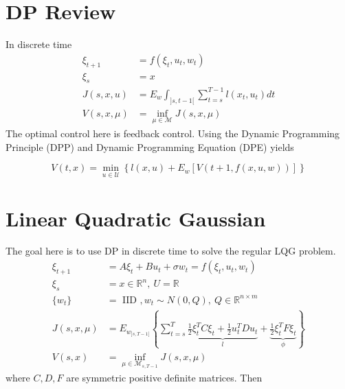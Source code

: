 \mainmatter%
\setcounter{page}{1}

\lectureseries[\course]{\course}

\date{October 13, 2009}

\setaddress%

\setcounter{lecture}{4}
\setcounter{chapter}{4}


\section{DP Review}
In discrete time
\begin{align*}
\xi_{t+1} &= f(\xi_t,u_t,w_t) \\
\xi_s &= x \\
J(s,x,u) &= E_w\int_{]s,t-1[}\sum_{t=s}^{T-1}l(x_t,u_t)dt \\%
V(s,x,\mu) &= \inf_{\mu\in\mathcal{M}}J(s,x,\mu)
\end{align*}
The optimal control here is feedback control.
Using the Dynamic Programming Principle (DPP) and Dynamic Programming Equation (DPE) yields

\begin{equation*}
V(t,x) = \min_{u\in\mathcal{U}}\left\lbrace l(x,u) + E_w[V(t+1,f(x,u,w))]\right\rbrace
\end{equation*}


\section{Linear Quadratic Gaussian}
The goal here is to use DP in discrete time to solve the regular LQG problem.
\begin{align*}
\xi_{t+1} &= A\xi_t + Bu_t + \sigma w_t = f(\xi_t,u_t,w_t) \\
\xi_s &= x \in \mathbb{R}^n,~U=\mathbb{R} \\
\{w_t\} &= \text{~IID~}, w_t\sim N(0,Q),~Q\in\mathbb{R}^{n\times m} \\
J(s,x,\mu) &= E_{w_{]s,T-1[}} \left\lbrace \sum_{t=s}^T \underbrace{\frac{1}{2}\xi_t^T C \xi_t+\frac{1}{2}u_t^T Du_t}_{l} + \underbrace{\frac{1}{2}\xi_t^T F\xi_t}_{\phi} \right\rbrace \\%
V(s,x) &= \inf_{\mu\in\mathcal{M}_{s,T-1}}J(s,x,\mu)
\end{align*}
where $C,D,F$ are symmetric positive definite matrices.
Then

